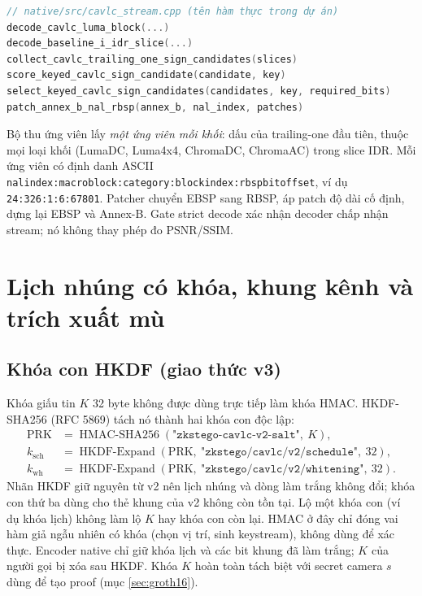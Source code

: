 \documentclass[11pt,a4paper]{article}
\renewcommand{\_}{\origunderscore\allowbreak}
\begin{document}
\begin{lstlisting}[language=C++]
// native/src/cavlc_stream.cpp (tên hàm thực trong dự án)
decode_cavlc_luma_block(...)
decode_baseline_i_idr_slice(...)
collect_cavlc_trailing_one_sign_candidates(slices)
score_keyed_cavlc_sign_candidate(candidate, key)
select_keyed_cavlc_sign_candidates(candidates, key, required_bits)
patch_annex_b_nal_rbsp(annex_b, nal_index, patches)
\end{lstlisting}
Bộ thu ứng viên lấy \emph{một ứng viên mỗi khối}: dấu của trailing-one đầu tiên, thuộc mọi loại khối (LumaDC, Luma4x4, ChromaDC, ChromaAC) trong slice IDR. Mỗi ứng viên có định danh ASCII \texttt{nal\_index:\allowbreak macroblock:\allowbreak category:\allowbreak block\_index:\allowbreak rbsp\_bit\_offset}, ví dụ \texttt{24:326:1:6:67801}. Patcher chuyển EBSP sang RBSP, áp patch độ dài cố định, dựng lại EBSP và Annex-B. Gate strict decode xác nhận decoder chấp nhận stream; nó không thay phép đo PSNR/SSIM.

\section{Lịch nhúng có khóa, khung kênh và trích xuất mù}\label{sec:channel}
\subsection{Khóa con HKDF (giao thức v3)}
Khóa giấu tin $K$ 32 byte không được dùng trực tiếp làm khóa HMAC. HKDF-SHA256 (RFC 5869) tách nó thành hai khóa con độc lập:
\begin{align*}
\mathrm{PRK} &= \operatorname{HMAC\text{-}SHA256}(\texttt{"zkstego-cavlc-v2-salt"},\ K),\\
k_{\mathrm{sch}} &= \operatorname{HKDF\text{-}Expand}(\mathrm{PRK},\ \texttt{"zkstego/cavlc/v2/schedule"},\ 32),\\
k_{\mathrm{wh}} &= \operatorname{HKDF\text{-}Expand}(\mathrm{PRK},\ \texttt{"zkstego/cavlc/v2/whitening"},\ 32).
\end{align*}
Nhãn HKDF giữ nguyên từ v2 nên lịch nhúng và dòng làm trắng không đổi; khóa con thứ ba dùng cho thẻ khung của v2 không còn tồn tại. Lộ một khóa con (ví dụ khóa lịch) không làm lộ $K$ hay khóa con còn lại. HMAC ở đây chỉ đóng vai hàm giả ngẫu nhiên có khóa (chọn vị trí, sinh keystream), không dùng để xác thực. Encoder native chỉ giữ khóa lịch và các bit khung đã làm trắng; $K$ của người gọi bị xóa sau HKDF. Khóa $K$ hoàn toàn tách biệt với secret camera $s$ dùng để tạo proof (mục \ref{sec:groth16}).
\end{document}
